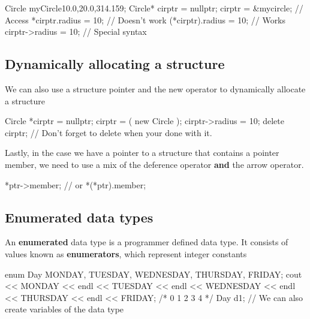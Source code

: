 \documentclass{report}
\begin{document}
	\begin{cppcode}
Circle myCircle{10.0,20.0,314.159};
Circle* cirptr = nullptr;
cirptr = &mycircle;
// Access
*cirptr.radius = 10; // Doesn't work
(*cirptr).radius = 10; // Works
cirptr->radius = 10; // Special syntax
	\end{cppcode}
	
	\bigbreak \noindent 

	\bigbreak \noindent 
	\subsection{Dynamically allocating a structure}
	\bigbreak \noindent 
	We can also use a structure pointer and the new operator to dynamically allocate a structure
	\bigbreak \noindent 
	
	\begin{cppcode}
Circle *cirptr = nullptr;
cirptr = ( new Circle );
cirptr->radius = 10;
delete cirptr; // Don't forget to delete when your done with it.
	\end{cppcode}
	
	\bigbreak \noindent 
	\bigbreak \noindent 
	Lastly, in the case we have a pointer to a structure that contains a pointer member, we need to use a mix of the deference operator \textbf{and} the arrow operator. 
	\bigbreak \noindent 
	
	\begin{cppcode}
*ptr->member;
// or
*(*ptr).member;
	\end{cppcode}
	

	\pagebreak \bigbreak \noindent 
	\subsection{Enumerated data types}
	\bigbreak \noindent 
	\begin{concept}
	   An \textbf{enumerated} data type is a programmer defined data type. It consists of values known as \textbf{enumerators}, which represent integer constants 
	\end{concept}
	\bigbreak \noindent 
	
	\begin{cppcode}
enum Day { MONDAY, TUESDAY, WEDNESDAY, THURSDAY, FRIDAY};
cout << MONDAY << endl 
    << TUESDAY << endl 
    << WEDNESDAY << endl 
    << THURSDAY << endl 
    << FRIDAY;
/*
0
1
2
3
4
*/
Day d1; //	We can also create variables of the data type
	\end{cppcode}
	
\end{document}
